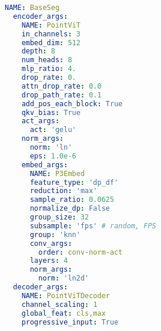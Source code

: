 \begin{minipage}{\linewidth}
\begin{lstlisting}[language=yaml, caption=\textbf{PointBERT Configuration}, label=lst:pointbert_config]
  NAME: BaseSeg
  encoder_args:
    NAME: PointViT
    in_channels: 3
    embed_dim: 512 
    depth: 8
    num_heads: 8
    mlp_ratio: 4.
    drop_rate: 0.
    attn_drop_rate: 0.0
    drop_path_rate: 0.1
    add_pos_each_block: True
    qkv_bias: True
    act_args:
      act: 'gelu'
    norm_args:
      norm: 'ln'
      eps: 1.0e-6
    embed_args:
      NAME: P3Embed
      feature_type: 'dp_df'
      reduction: 'max'
      sample_ratio: 0.0625
      normalize_dp: False 
      group_size: 32
      subsample: 'fps' # random, FPS
      group: 'knn'
      conv_args:
        order: conv-norm-act
      layers: 4
      norm_args: 
        norm: 'ln2d'
  decoder_args:
    NAME: PointViTDecoder
    channel_scaling: 1
    global_feat: cls,max
    progressive_input: True
\end{lstlisting}
\end{minipage}
